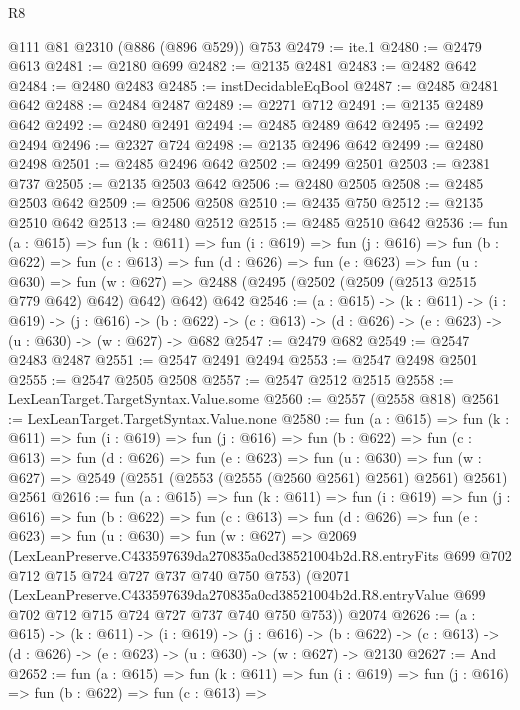 \begin{lexlean}{R8}
\begin{coremodule}
    @111
    @81
    @2310
    (@886 (@896 @529))
    @753
@2479 := ite.{1}
@2480 := @2479 @613
@2481 := @2180 @699
@2482 := @2135 @2481
@2483 := @2482 @642
@2484 := @2480 @2483
@2485 := instDecidableEqBool
@2487 := @2485 @2481 @642
@2488 := @2484 @2487
@2489 := @2271 @712
@2491 := @2135 @2489 @642
@2492 := @2480 @2491
@2494 := @2485 @2489 @642
@2495 := @2492 @2494
@2496 := @2327 @724
@2498 := @2135 @2496 @642
@2499 := @2480 @2498
@2501 := @2485 @2496 @642
@2502 := @2499 @2501
@2503 := @2381 @737
@2505 := @2135 @2503 @642
@2506 := @2480 @2505
@2508 := @2485 @2503 @642
@2509 := @2506 @2508
@2510 := @2435 @750
@2512 := @2135 @2510 @642
@2513 := @2480 @2512
@2515 := @2485 @2510 @642
@2536 := fun (a : @615) =>
  fun (k : @611) =>
  fun (i : @619) =>
  fun (j : @616) =>
  fun (b : @622) =>
  fun (c : @613) =>
  fun (d : @626) =>
  fun (e : @623) =>
  fun (u : @630) =>
  fun (w : @627) => @2488 (@2495 (@2502 (@2509 (@2513 @2515 @779 @642) @642) @642) @642) @642
@2546 := (a : @615) ->
  (k : @611) ->
  (i : @619) ->
  (j : @616) ->
  (b : @622) -> (c : @613) -> (d : @626) -> (e : @623) -> (u : @630) -> (w : @627) -> @682
@2547 := @2479 @682
@2549 := @2547 @2483 @2487
@2551 := @2547 @2491 @2494
@2553 := @2547 @2498 @2501
@2555 := @2547 @2505 @2508
@2557 := @2547 @2512 @2515
@2558 := LexLeanTarget.TargetSyntax.Value.some
@2560 := @2557 (@2558 @818)
@2561 := LexLeanTarget.TargetSyntax.Value.none
@2580 := fun (a : @615) =>
  fun (k : @611) =>
  fun (i : @619) =>
  fun (j : @616) =>
  fun (b : @622) =>
  fun (c : @613) =>
  fun (d : @626) =>
  fun (e : @623) =>
  fun (u : @630) =>
  fun (w : @627) => @2549 (@2551 (@2553 (@2555 (@2560 @2561) @2561) @2561) @2561) @2561
@2616 := fun (a : @615) =>
  fun (k : @611) =>
  fun (i : @619) =>
  fun (j : @616) =>
  fun (b : @622) =>
  fun (c : @613) =>
  fun (d : @626) =>
  fun (e : @623) =>
  fun (u : @630) =>
  fun (w : @627) =>
  @2069
    (LexLeanPreserve.C433597639da270835a0cd38521004b2d.R8.entryFits
      @699
      @702
      @712
      @715
      @724
      @727
      @737
      @740
      @750
      @753)
    (@2071
      (LexLeanPreserve.C433597639da270835a0cd38521004b2d.R8.entryValue
        @699
        @702
        @712
        @715
        @724
        @727
        @737
        @740
        @750
        @753))
    @2074
@2626 := (a : @615) ->
  (k : @611) ->
  (i : @619) ->
  (j : @616) ->
  (b : @622) -> (c : @613) -> (d : @626) -> (e : @623) -> (u : @630) -> (w : @627) -> @2130
@2627 := And
@2652 := fun (a : @615) =>
  fun (k : @611) =>
  fun (i : @619) =>
  fun (j : @616) =>
  fun (b : @622) =>
  fun (c : @613) =>

\end{coremodule}
\end{lexlean}
